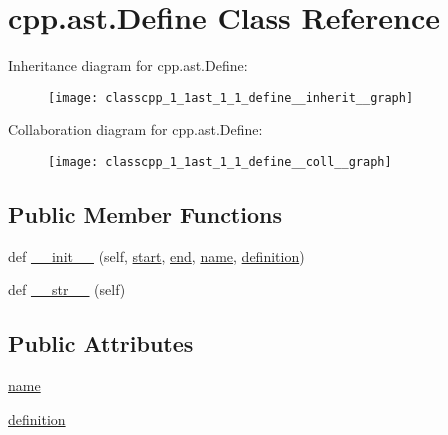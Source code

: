 \hypertarget{classcpp_1_1ast_1_1_define}{}\section{cpp.\+ast.\+Define Class Reference}
\label{classcpp_1_1ast_1_1_define}


Inheritance diagram for cpp.\+ast.\+Define\+:
\nopagebreak
\begin{figure}[H]
\begin{center}
\leavevmode
\texttt{[image: classcpp\_1\_1ast\_1\_1\_define\_\_inherit\_\_graph]}
\end{center}
\end{figure}


Collaboration diagram for cpp.\+ast.\+Define\+:
\nopagebreak
\begin{figure}[H]
\begin{center}
\leavevmode
\texttt{[image: classcpp\_1\_1ast\_1\_1\_define\_\_coll\_\_graph]}
\end{center}
\end{figure}
\subsection*{Public Member Functions}
\begin{DoxyCompactItemize}
\item 
def \hyperlink{classcpp_1_1ast_1_1_define_ae9af61866e010a863ba9f8818ec8924c}{\+\_\+\+\_\+init\+\_\+\+\_\+} (self, \hyperlink{classcpp_1_1ast_1_1_node_a7b2aa97e6a049bb1a93aea48c48f1f44}{start}, \hyperlink{classcpp_1_1ast_1_1_node_a3c5e5246ccf619df28eca02e29d69647}{end}, \hyperlink{classcpp_1_1ast_1_1_define_a8879216f09e88f79d7baa49bcfa10ebd}{name}, \hyperlink{classcpp_1_1ast_1_1_define_a0c636652dfeb2f15e62793afea1153c9}{definition})
\item 
def \hyperlink{classcpp_1_1ast_1_1_define_aa89732914b19901c8d291e11f34bb627}{\+\_\+\+\_\+str\+\_\+\+\_\+} (self)
\end{DoxyCompactItemize}
\subsection*{Public Attributes}
\begin{DoxyCompactItemize}
\item 
\hyperlink{classcpp_1_1ast_1_1_define_a8879216f09e88f79d7baa49bcfa10ebd}{name}
\item 
\hyperlink{classcpp_1_1ast_1_1_define_a0c636652dfeb2f15e62793afea1153c9}{definition}
\end{DoxyCompactItemize}


